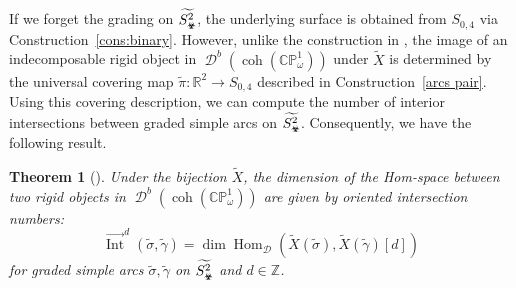 \documentclass[11pt,a4paper,reqno]{amsart}%
\theoremstyle{plain}
\newtheorem{theorem}{Theorem}[section]
\theoremstyle{definition}
\numberwithin{equation}{section}
\numberwithin{equation}{section}
\def\ZZ{\mathbb{Z}}
\newcommand{\cD}{\mathcal{D}}
\newcommand{\Hom}{\operatorname{Hom}\nolimits}
\newcommand{\D}{\operatorname{\mathcal{D}}}
\newcommand{\oInt}{\overrightarrow{\operatorname{Int}}}
\def\wt{\omega}
\def\x{_\vot}
\def\coh{\operatorname{coh}}
\def\Hom{\operatorname{Hom}}
\def\coh{\operatorname{coh}}
\def\CPone{\mathbb{CP}^1_{\wt}}
\newcommand\DC[1]{\D^b(\coh(#1))}
\def\wX{\widetilde{X}}
\def\vot{\text{\Biohazard}}
\begin{document}
If we forget the grading  on $\widetilde{S\x^2}$,  the underlying surface is obtained from    $S_{0,4}$ via
Construction~\ref{cons:binary}.  
However, unlike the construction in  \cite{BG}, the
  image of an indecomposable rigid object in $\DC{\CPone}$ under $\widetilde{X}$ is determined by
 the universal covering map $\tilde{\pi} \colon\mathbb{R}^2 \to S_{0,4} $ described in Construction~\ref{arcs pair}.
 Using this covering description, we can compute the number of interior intersections between graded simple arcs on $\widetilde{S\x^2}$. 
Consequently, we have the following result.
\begin{theorem}[{}]
  Under the bijection $\wX$, the dimension of the Hom-space between two rigid objects in $\DC{\CPone}$ are given by oriented intersection numbers:
\begin{equation}
\oInt^d(\widetilde{\sigma},\widetilde{\gamma})
=\dim\Hom_{\cD}(\wX(\widetilde{\sigma}),\wX(\widetilde{\gamma})[d])
\end{equation}
for graded simple arcs $\widetilde{\sigma},\widetilde{\gamma}$ on $\widetilde{S\x^2}$ and $d\in\ZZ$.
\end{theorem}
 
\end{document}
